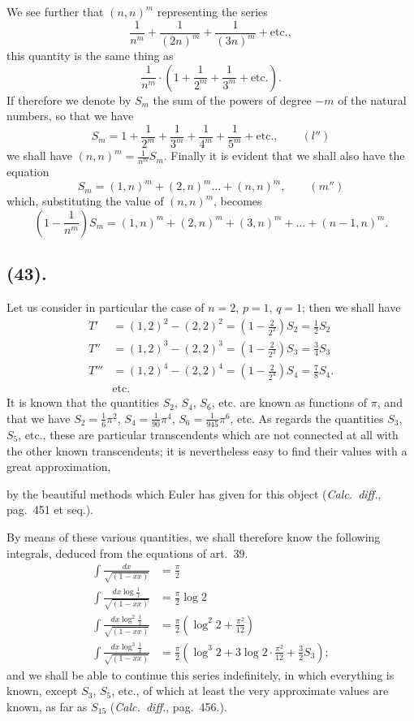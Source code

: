 \documentclass{article}
\begin{document}
We see further that $(n,n)^{m}$ representing the series
\[ \frac{1}{n^{m}}+\frac{1}{(2n)^{m}}+\frac{1}{(3n)^{m}}+\text{etc.}, \]
this quantity is the same thing as
\[ \frac{1}{n^{m}}\cdot\left(1+\frac{1}{2^{m}}+\frac{1}{3^{m}}+\text{etc.}\right). \]
If therefore we denote by $S_{m}$ the sum of the powers of degree $-m$ of the natural numbers, so that we have
\[ S_{m}=1+\frac{1}{2^{m}}+\frac{1}{3^{m}}+\frac{1}{4^{m}}+\frac{1}{5^{m}}+\text{etc.},\qquad(l'') \]
we shall have $(n,n)^{m}=\frac{1}{n^{m}}S_{m}$. Finally it is evident that we shall also have the equation
\[ S_{m}=(1,n)^{m}+(2,n)^{m}\ldots+(n,n)^{m},\qquad(m'') \]
which, substituting the value of $(n,n)^{m}$, becomes
\[ \left(1-\frac{1}{n^{m}}\right)S_{m}=(1,n)^{m}+(2,n)^{m}+(3,n)^{m}+\ldots+(n-1,n)^{m}. \]

\subsection*{(43).}

Let us consider in particular the case of $n=2$, $p=1$, $q=1$; then we shall have
\[ \begin{aligned} T'&=(1,2)^{2}-(2,2)^{2}=\left(1-\frac{2}{2^{2}}\right)S_{2}=\frac{1}{2}S_{2}\\ T''&=(1,2)^{3}-(2,2)^{3}=\left(1-\frac{2}{2^{3}}\right)S_{3}=\frac{3}{4}S_{3}\\ T'''&=(1,2)^{4}-(2,2)^{4}=\left(1-\frac{2}{2^{4}}\right)S_{4}=\frac{7}{8}S_{4}.\\ &\text{etc.} \end{aligned} \]
It is known that the quantities $S_{2}$, $S_{4}$, $S_{6}$, etc. are known as functions of $\pi$, and that we have $S_{2}=\frac{1}{6}\pi^{2}$, $S_{4}=\frac{1}{90}\pi^{4}$, $S_{6}=\frac{1}{945}\pi^{6}$, etc. As regards the quantities $S_{3}$, $S_{5}$, etc., these are particular transcendents which are not connected at all with the other known transcendents; it is nevertheless easy to find their values with a great approximation,

by the beautiful methods which Euler has given for this object (\emph{Calc.\ diff.}, pag.\ 451 et seq.).

By means of these various quantities, we shall therefore know the following integrals, deduced from the equations of art.\ 39.
\[ \begin{aligned} \int\frac{dx}{\sqrt{(1-xx)}}&=\frac{\pi}{2}\\ \int\frac{dx\log\frac{1}{x}}{\sqrt{(1-xx)}}&=\frac{\pi}{2}\log 2\\ \int\frac{dx\log^{2}\frac{1}{x}}{\sqrt{(1-xx)}}&=\frac{\pi}{2}\left(\log^{2}2+\frac{\pi^{2}}{12}\right)\\ \int\frac{dx\log^{3}\frac{1}{x}}{\sqrt{(1-xx)}}&=\frac{\pi}{2}\left(\log^{3}2+3\log 2\cdot\frac{\pi^{2}}{12}+\frac{3}{2}S_{3}\right); \end{aligned} \]
and we shall be able to continue this series indefinitely, in which everything is known, except $S_{3}$, $S_{5}$, etc., of which at least the very approximate values are known, as far as $S_{15}$ (\emph{Calc.\ diff.}, pag.\ 456.).
\end{document}

